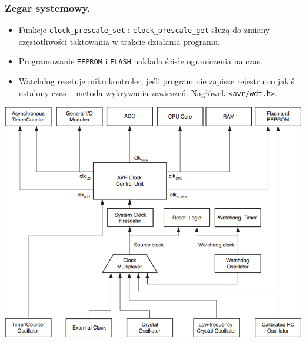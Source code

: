 \documentclass[8pt]{beamer}
\begin{document}
\begin{frame}
  \frametitle{Zegar systemowy.}

  \begin{itemize}
    \item Funkcje \texttt{clock\_prescale\_set} i \texttt{clock\_prescale\_get}
      służą do zmiany częstotliwości taktowania w trakcie działania programu.
    \item Programowanie \texttt{EEPROM} i \texttt{FLASH} nakłada ścisłe
      ograniczenia na czas.
    \item Watchdog resetuje mikrokontroler, jeśli program nie zapisze rejestru
      co jakiś ustalony czas -- metoda wykrywania zawieszeń. Nagłówek \texttt{<avr/wdt.h>}.
  \end{itemize}

  \begin{center}
    \includegraphics[scale=0.5]{images/clock.png}
  \end{center}
\end{frame}
\end{document}
